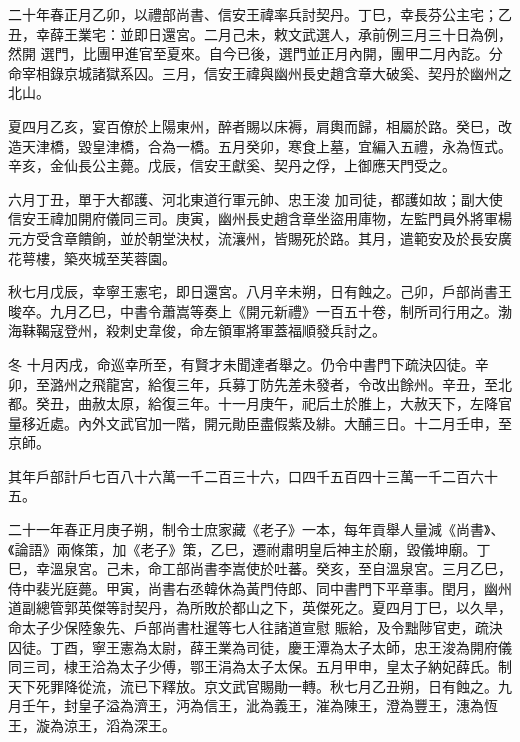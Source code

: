 \begin{pinyinscope}
 二十年春正月乙卯，以禮部尚書、信安王禕率兵討契丹。丁巳，幸長芬公主宅；乙丑，幸薛王業宅：並即日還宮。二月己未，敕文武選人，承前例三月三十日為例，然開
 選門，比團甲進官至夏來。自今已後，選門並正月內開，團甲二月內訖。分命宰相錄京城諸獄系囚。三月，信安王禕與幽州長史趙含章大破奚、契丹於幽州之北山。



 夏四月乙亥，宴百僚於上陽東州，醉者賜以床褥，肩輿而歸，相屬於路。癸巳，改造天津橋，毀皇津橋，合為一橋。五月癸卯，寒食上墓，宜編入五禮，永為恆式。辛亥，金仙長公主薨。戊辰，信安王獻奚、契丹之俘，上御應天門受之。



 六月丁丑，單于大都護、河北東道行軍元帥、忠王浚
 加司徒，都護如故；副大使信安王禕加開府儀同三司。庚寅，幽州長史趙含章坐盜用庫物，左監門員外將軍楊元方受含章饋餉，並於朝堂決杖，流瀼州，皆賜死於路。其月，遣範安及於長安廣花萼樓，築夾城至芙蓉園。



 秋七月戊辰，幸寧王憲宅，即日還宮。八月辛未朔，日有蝕之。己卯，戶部尚書王晙卒。九月乙巳，中書令蕭嵩等奏上《開元新禮》一百五十卷，制所司行用之。渤海靺鞨寇登州，殺刺史韋俊，命左領軍將軍蓋福順發兵討之。



 冬
 十月丙戌，命巡幸所至，有賢才未聞達者舉之。仍令中書門下疏決囚徒。辛卯，至潞州之飛龍宮，給復三年，兵募丁防先差未發者，令改出餘州。辛丑，至北都。癸丑，曲赦太原，給復三年。十一月庚午，祀后土於脽上，大赦天下，左降官量移近處。內外文武官加一階，開元勛臣盡假紫及緋。大酺三日。十二月壬申，至京師。



 其年戶部計戶七百八十六萬一千二百三十六，口四千五百四十三萬一千二百六十五。



 二十一年春正月庚子朔，制令士庶家藏《老子》一本，每年貢舉人量減《尚書》、《論語》兩條策，加《老子》策，乙巳，遷祔肅明皇后神主於廟，毀儀坤廟。丁巳，幸溫泉宮。己未，命工部尚書李嵩使於吐蕃。癸亥，至自溫泉宮。三月乙巳，侍中裴光庭薨。甲寅，尚書右丞韓休為黃門侍郎、同中書門下平章事。閏月，幽州道副總管郭英傑等討契丹，為所敗於都山之下，英傑死之。夏四月丁巳，以久旱，命太子少保陸象先、戶部尚書杜暹等七人往諸道宣慰
 賑給，及令黜陟官吏，疏決囚徒。丁酉，寧王憲為太尉，薛王業為司徒，慶王潭為太子太師，忠王浚為開府儀同三司，棣王洽為太子少傅，鄂王涓為太子太保。五月甲申，皇太子納妃薛氏。制天下死罪降從流，流已下釋放。京文武官賜勛一轉。秋七月乙丑朔，日有蝕之。九月壬午，封皇子溢為濟王，沔為信王，泚為義王，漼為陳王，澄為豐王，潓為恆王，漩為涼王，滔為深王。




\end{pinyinscope}
